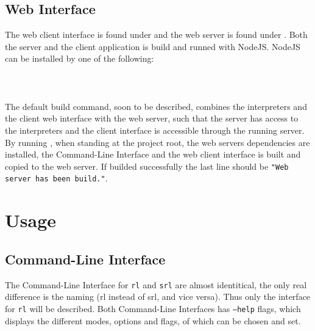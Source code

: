 \subsection*{Web Interface}
%

The web client interface is found under  and the web server is found under .
Both the server and the client application is build and runned with NodeJS. NodeJS can be installed by one of the following:\\
\\
\\
\\

\noindent
The default build command, soon to be described, combines the interpreters and the client web interface with the web server, such that the server has access to the interpreters and the client interface is accessible through the running server.\\
By running , when standing at the project root, the web servers dependencies are installed, the Command-Line Interface and the web client interface is built and copied to the web server.
If builded successfully the last line should be \texttt{"Web server has been build."}.


\section*{Usage}
%

\subsection*{Command-Line Interface}
%

 The Command-Line Interface for \texttt{rl} and \texttt{srl} are almost identitical, the only real difference is the naming (rl instead of srl, and vice versa).
 Thus only the interface for \texttt{rl} will be described.
 Both Command-Line Interfaces has \texttt{--help} flags, which displays the different modes, options and flags, of which can be chosen and set.\\

 \\

